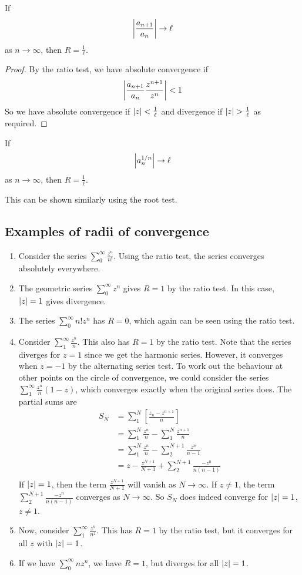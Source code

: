 \begin{lemma}
	If
	\[
		\abs{\frac{a_{n+1}}{a_n}} \to \ell
	\]
	as \(n \to \infty\), then \(R = \frac{1}{\ell}\).
\end{lemma}
\begin{proof}
	By the ratio test, we have absolute convergence if
	\[
		\abs{\frac{a_{n+1}}{a_n} \frac{z^{n+1}}{z^n}} < 1
	\]
	So we have absolute convergence if \(\abs{z} < \frac{1}{\ell}\) and divergence if \(\abs{z} > \frac{1}{\ell}\) as required.
\end{proof}
\begin{lemma}
	If
	\[
		\abs{a_n^{1/n}} \to \ell
	\]
	as \(n \to \infty\), then \(R = \frac{1}{\ell}\).
\end{lemma}
\noindent This can be shown similarly using the root test.

\subsection{Examples of radii of convergence}
\begin{enumerate}
	\item Consider the series \(\sum_0^\infty \frac{z^n}{n!}\).
	      Using the ratio test, the series converges absolutely everywhere.
	\item The geometric series \(\sum_0^\infty z^n\) gives \(R=1\) by the ratio test.
	      In this case, \(\abs{z} = 1\) gives divergence.
	\item The series \(\sum_0^\infty n!z^n\) has \(R=0\), which again can be seen using the ratio test.
	\item Consider \(\sum_1^\infty \frac{z^n}{n}\).
	      This also has \(R = 1\) by the ratio test.
	      Note that the series diverges for \(z=1\) since we get the harmonic series.
	      However, it converges when \(z = -1\) by the alternating series test.
	      To work out the behaviour at other points on the circle of convergence, we could consider the series \(\sum_1^\infty \frac{z^n}{n}(1-z)\), which converges exactly when the original series does.
	      The partial sums are
	      \begin{align*}
		      S_N & = \sum_1^N \left[ \frac{z_n - z^{n+1}}{n} \right]            \\
		          & = \sum_1^N \frac{z^n}{n} - \sum_1^N \frac{z^{n+1}}{n}        \\
		          & = \sum_1^N \frac{z^n}{n} - \sum_2^{N+1} \frac{z^n}{n-1}      \\
		          & = z - \frac{z^{N+1}}{N+1} + \sum_2^{N+1} \frac{-z^n}{n(n-1)} \\
	      \end{align*}
	      If \(\abs{z} = 1\), then the term \(\frac{z^{N+1}}{N+1}\) will vanish as \(N \to \infty\).
	      If \(z \neq 1\), the term \(\sum_2^{N+1} \frac{-z^n}{n(n-1)}\) converges as \(N \to \infty\).
	      So \(S_N\) does indeed converge for \(\abs{z} = 1\), \(z \neq 1\).
	\item Now, consider \(\sum_1^\infty \frac{z^n}{n^2}\).
	      This has \(R=1\) by the ratio test, but it converges for all \(z\) with \(\abs{z} = 1\).
	\item If we have \(\sum_0^\infty nz^n\), we have \(R=1\), but diverges for all \(\abs{z} = 1\).
\end{enumerate}
